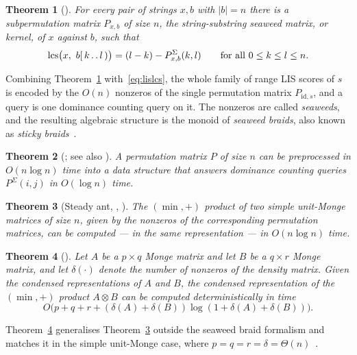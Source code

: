 \documentclass[10pt]{article}
\newtheorem{theorem}{Theorem}
\newcommand{\lcs}{\operatorname{lcs}}
\newcommand{\id}{\mathrm{id}}
\begin{document}
\begin{theorem}[{\cite[Theorem 4.10, Definition 4.11]{TiskinArXiv}}]\label{thm:kernel}
For every pair of strings $x,b$ with $|b|=n$ there is a subpermutation matrix
$P_{x,b}$ of size $n$, the \emph{string-substring seaweed matrix}, or
\emph{kernel}, of $x$ against $b$, such that
\[
\lcs\bigl(x,\ b[\,k\mathinner{.\,.}l\,)\bigr)=(l-k)-P^{\Sigma}_{x,b}(k,l)
\qquad\text{for all }0\le k\le l\le n.
\]
\end{theorem}

Combining Theorem~\ref{thm:kernel} with~\eqref{eq:lislcs}, the whole family of
range LIS scores of $s$ is encoded by the $O(n)$ nonzeros of the single
permutation matrix $P_{\id,s}$, and a query is one dominance counting query on
it. The nonzeros are called \emph{seaweeds}, and the resulting algebraic
structure is the monoid of \emph{seaweed braids}, also known as \emph{sticky
braids}~\cite[Chapter 3]{TiskinArXiv}.

\begin{theorem}[{\cite[Fact 4.1]{GGK25}}; see also {\cite[Theorem 2.15]{TiskinArXiv}}]\label{thm:domcount}
A permutation matrix $P$ of size $n$ can be preprocessed in $O(n\log n)$ time
into a data structure that answers dominance counting queries $P^{\Sigma}(i,j)$
in $O(\log n)$ time.
\end{theorem}

\begin{theorem}[Steady ant, {\cite[Theorems 4.19, 4.21]{TiskinArXiv}}, {\cite{Tiskin15}}]\label{thm:steadyant}
The $(\min,+)$ product of two simple unit-Monge matrices of size $n$, given by
the nonzeros of the corresponding permutation matrices, can be computed --- in
the same representation --- in $O(n\log n)$ time.
\end{theorem}

\begin{theorem}[{\cite[Theorem 1.2]{GGK25}}]\label{thm:coresparse}
Let $A$ be a $p\times q$ Monge matrix and let $B$ be a $q\times r$ Monge
matrix, and let $\delta(\cdot)$ denote the number of nonzeros of the density
matrix. Given the condensed representations of $A$ and $B$, the condensed
representation of the $(\min,+)$ product $A\otimes B$ can be computed
deterministically in time
\[
O\bigl(p+q+r+(\delta(A)+\delta(B))\log(1+\delta(A)+\delta(B))\bigr).
\]
\end{theorem}

Theorem~\ref{thm:coresparse} generalises Theorem~\ref{thm:steadyant} outside the
seaweed braid formalism and matches it in the simple unit-Monge case, where
$p=q=r=\delta=\Theta(n)$~\cite[Section 1]{GGK25}.
\end{document}
